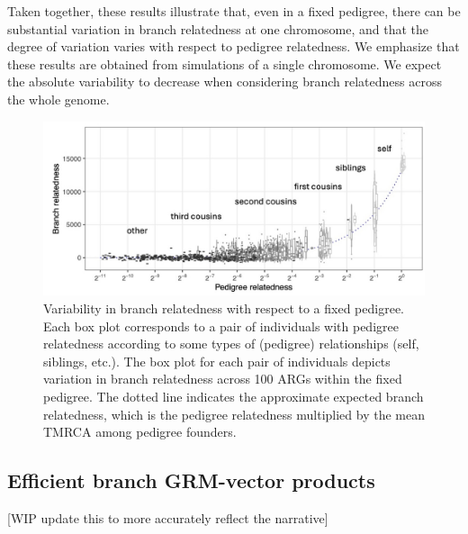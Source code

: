 Taken together, these results illustrate that, even in a fixed pedigree,
there can be substantial variation in branch relatedness at one chromosome,
and that the degree of variation varies with respect to pedigree relatedness.
%
We emphasize that these results are obtained from simulations of a single chromosome.
%
We expect the absolute variability to decrease when considering
branch relatedness across the whole genome.

\begin{figure}
    \centering
    \includegraphics[width=\textwidth]{Figures/Fig5_branch_recap_sim_boxplot_combined_behind2.jpg}
    \caption{Variability in branch relatedness with respect to a fixed pedigree.
    Each box plot corresponds to a pair of individuals with pedigree relatedness
    according to some types of (pedigree) relationships (self, siblings, etc.).
    The box plot for each pair of individuals depicts variation in branch relatedness across 100 ARGs within the fixed pedigree.
    The dotted line indicates the approximate expected branch relatedness,
    which is the pedigree relatedness multiplied by the mean TMRCA among pedigree founders.}
    \label{fig:boxplots}
\end{figure}



% 


\subsection{Efficient branch GRM-vector products}
[WIP update this to more accurately reflect the narrative]

